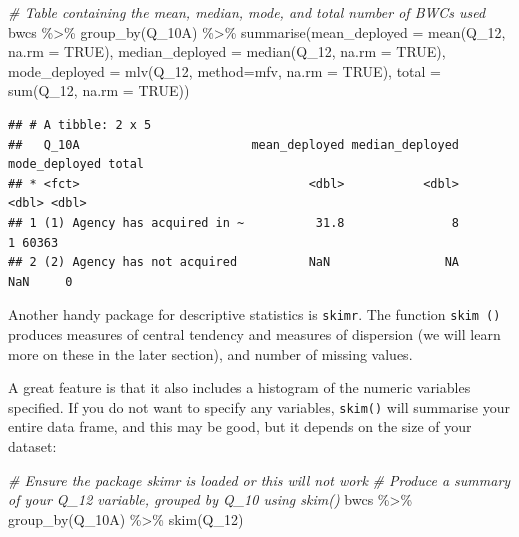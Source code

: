 \documentclass[
]{book}
\newenvironment{Shaded}{\begin{snugshade}}{\end{snugshade}}
\newcommand{\AttributeTok}[1]{\textcolor[rgb]{0.77,0.63,0.00}{#1}}
\newcommand{\CommentTok}[1]{\textcolor[rgb]{0.56,0.35,0.01}{\textit{#1}}}
\newcommand{\ConstantTok}[1]{\textcolor[rgb]{0.00,0.00,0.00}{#1}}
\newcommand{\FunctionTok}[1]{\textcolor[rgb]{0.00,0.00,0.00}{#1}}
\newcommand{\NormalTok}[1]{#1}
\newcommand{\SpecialCharTok}[1]{\textcolor[rgb]{0.00,0.00,0.00}{#1}}
\newcommand{\StringTok}[1]{\textcolor[rgb]{0.31,0.60,0.02}{#1}}
\begin{document}
\begin{Shaded}
\begin{Highlighting}[]
\CommentTok{\# Table containing the mean, median, mode, and total number of BWCs used }
\NormalTok{bwcs }\SpecialCharTok{\%\textgreater{}\%}
  \FunctionTok{group\_by}\NormalTok{(Q\_10A) }\SpecialCharTok{\%\textgreater{}\%} 
  \FunctionTok{summarise}\NormalTok{(}\AttributeTok{mean\_deployed =} \FunctionTok{mean}\NormalTok{(Q\_12, }\AttributeTok{na.rm =} \ConstantTok{TRUE}\NormalTok{),}
            \AttributeTok{median\_deployed =} \FunctionTok{median}\NormalTok{(Q\_12, }\AttributeTok{na.rm =} \ConstantTok{TRUE}\NormalTok{), }
            \AttributeTok{mode\_deployed =} \FunctionTok{mlv}\NormalTok{(Q\_12, }\AttributeTok{method=}\StringTok{\textquotesingle{}mfv\textquotesingle{}}\NormalTok{, }\AttributeTok{na.rm =} \ConstantTok{TRUE}\NormalTok{), }
            \AttributeTok{total =} \FunctionTok{sum}\NormalTok{(Q\_12, }\AttributeTok{na.rm =} \ConstantTok{TRUE}\NormalTok{))}
\end{Highlighting}
\end{Shaded}

\begin{verbatim}
## # A tibble: 2 x 5
##   Q_10A                        mean_deployed median_deployed mode_deployed total
## * <fct>                                <dbl>           <dbl>         <dbl> <dbl>
## 1 (1) Agency has acquired in ~          31.8               8             1 60363
## 2 (2) Agency has not acquired          NaN                NA           NaN     0
\end{verbatim}

Another handy package for descriptive statistics is \texttt{skimr}. The function \texttt{skim\ ()} produces measures of central tendency and measures of dispersion (we will learn more on these in the later section), and number of missing values.

A great feature is that it also includes a histogram of the numeric variables specified. If you do not want to specify any variables, \texttt{skim()} will summarise your entire data frame, and this may be good, but it depends on the size of your dataset:

\begin{Shaded}
\begin{Highlighting}[]
\CommentTok{\# Ensure the package \textquotesingle{}skimr\textquotesingle{} is loaded or this will not work}
\CommentTok{\# Produce a summary of your Q\_12 variable, grouped by Q\_10 using skim() }
\NormalTok{bwcs }\SpecialCharTok{\%\textgreater{}\%} 
  \FunctionTok{group\_by}\NormalTok{(Q\_10A) }\SpecialCharTok{\%\textgreater{}\%} 
  \FunctionTok{skim}\NormalTok{(Q\_12)}
\end{Highlighting}
\end{Shaded}
\end{document}
